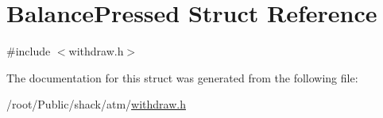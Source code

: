 \hypertarget{structBalancePressed}{\section{Balance\-Pressed Struct Reference}
\label{structBalancePressed}
}


{\ttfamily \#include $<$withdraw.\-h$>$}



The documentation for this struct was generated from the following file\-:\begin{DoxyCompactItemize}
\item 
/root/\-Public/shack/atm/\hyperlink{withdraw_8h}{withdraw.\-h}\end{DoxyCompactItemize}
